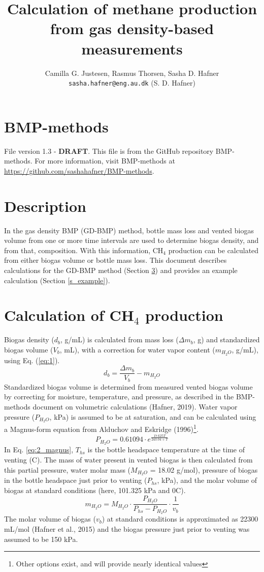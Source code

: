 \documentclass[]{article}
\title {Calculation of methane production from gas density-based measurements}
\author{Camilla G. Justesen, Rasmus Thorsen, Sasha D. Hafner
\\
\texttt{sasha.hafner@eng.au.dk} (S. D. Hafner)\\
}
\begin{document}
\maketitle

\section{BMP-methods}
File version 1.3 - \textbf{DRAFT}. 
This file is from the GitHub repository BMP-methods.
For more information, visit BMP-methods at \url{https://github.com/sashahafner/BMP-methods}.

\section{Description}
In the gas density BMP (GD-BMP) method, bottle mass loss and vented biogas volume from one or more time intervals are used to determine biogas density, and from that, composition. 
With this information, CH$_4$ production can be calculated from either biogas volume or bottle mass loss.
This document describes calculations for the GD-BMP method (Section \ref{s_equations}) and provides an example calculation (Section \ref{s_example}).

\section{Calculation of CH$_4$ production} \label{s_equations}
Biogas density ($d_b$, g/mL) is calculated from  mass loss ($\Delta m_b$, g) and standardized biogas volume ($V_b$, mL), with a correction for water vapor content ($m_{H_2O}$, g/mL), using Eq. (\ref{eq:1}). 
\begin{equation}
  \label{eq:1}
  d_b=\frac{\Delta m_b}{V_b}-m_{H_2O}
\end{equation}
Standardized biogas volume is determined from measured vented biogas volume by correcting for moisture, temperature, and pressure, as described in the BMP-methods document on volumetric calculations (Hafner, 2019).
Water vapor pressure ($P_{H_2O}$, kPa) is assumed to be at saturation, and can be calculated using a Magnus-form equation from Alduchov and Eskridge (1996)\footnote{
  Other options exist, and will provide nearly identical values}.
\begin{equation}
\label{eq:2_magnus}
   P_{H_2O} = 0.61094 \cdot e^{\frac{17.625 T}{243.04 + T}}
\end{equation}
In Eq. \ref{eq:2_magnus}, $T_{hs}$ is the bottle headspace temperature at the time of venting (\degree C). 
The mass of water present in vented biogas is then calculated from this partial pressure, water molar mass ($M_{H_2O}$ = 18.02 g/mol), pressure of biogas in the bottle headspace just prior to venting ($P_{hs}$, kPa), and the molar volume of biogas at standard conditions (here, 101.325 kPa and 0\degree C).
\begin{equation}
  \label{eq:3}
  m_{H_2O}=M_{H_2O} \cdot \frac{P_{H_2O}}{P_{hs}-P_{H_2O}} \cdot \frac{1}{v_b}
\end{equation}
The molar volume of biogas ($v_b$) at standard conditions is approximated as 22300 mL/mol (Hafner et al., 2015) and the biogas pressure just prior to venting was assumed to be 150 kPa.
\end{document}
